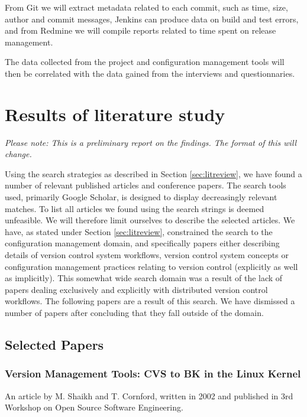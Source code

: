 \documentclass{article}
\begin{document}
From Git we will extract metadata related to each commit, such as
time, size, author and commit messages, Jenkins can produce data on
build and test errors, and from Redmine we will compile reports
related to time spent on release management.

The data collected from the project and configuration management tools
will then be correlated with the data gained from the interviews and
questionnaries.

\section{Results of literature study}

\begin{center}
 \emph{Please note: This is a preliminary report on the findings. The format
       of this will change.}
\end{center}

Using the search strategies as described in Section \ref{sec:litreview}, 
we have found a number of relevant published articles and conference 
papers.  The search tools used, primarily Google Scholar, is designed to 
display decreasingly relevant matches. To list all articles we found 
using the search strings is deemed unfeasible. We will therefore limit 
ourselves to describe the selected articles. We have, as stated under
Section \ref{sec:litreview}, constrained the search to the configuration
management domain, and specifically papers either describing details of
version control system workflows, version control system concepts or
configuration management practices relating to version control (explicitly
as well as implicitly). This somewhat wide search domain was a result of the
lack of papers dealing exclusively and explicitly with distributed version 
control workflows. The following papers are a result of this search. We
have dismissed a number of papers after concluding that they fall outside of
the domain. 

\subsection{Selected Papers}
\subsubsection{Version Management Tools: CVS to BK in the Linux Kernel}

An article by M. Shaikh and T. Cornford, written in 2002 and published 
in 3rd Workshop on Open Source Software Engineering\cite{shaikh02}.
\end{document}

